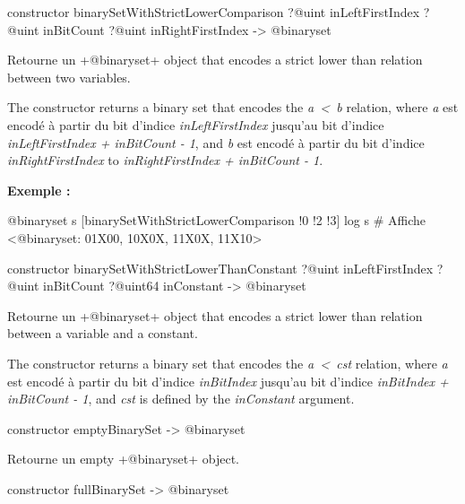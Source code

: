 \begin{galgas}
constructor binarySetWithStrictLowerComparison
  ?@uint inLeftFirstIndex
  ?@uint inBitCount
  ?@uint inRightFirstIndex
  -> @binaryset
\end{galgas}


Retourne un \ggs+@binaryset+ object that encodes a strict lower than relation between two variables.

The constructor returns a binary set that encodes the \emph{a~<~b} relation, where \emph{a} est encodé à partir du bit d'indice \emph{inLeftFirstIndex} jusqu'au bit d'indice \emph{inLeftFirstIndex  + inBitCount - 1}, and \emph{b} est encodé à partir du bit d'indice \emph{inRightFirstIndex} to \emph{inRightFirstIndex + inBitCount - 1}.

\textbf{Exemple :}
\begin{galgas}
@binaryset s [binarySetWithStrictLowerComparison !0 !2 !3]
log s # Affiche <@binaryset: 01X00, 10X0X, 11X0X, 11X10>
\end{galgas}





\begin{galgas}
constructor binarySetWithStrictLowerThanConstant
  ?@uint inLeftFirstIndex
  ?@uint inBitCount
  ?@uint64 inConstant
  -> @binaryset
\end{galgas}


Retourne un \ggs+@binaryset+ object that encodes a strict lower than relation between a variable and a constant.

The constructor returns a binary set that encodes the \emph{a~<~cst} relation, where \emph {a} est encodé à partir du bit d'indice \emph{inBitIndex} jusqu'au bit d'indice \emph{inBitIndex  + inBitCount - 1}, and \emph{cst} is defined by the \emph{inConstant} argument.





\begin{galgas}
constructor emptyBinarySet -> @binaryset
\end{galgas}


Retourne un empty \ggs+@binaryset+ object.






\begin{galgas}
constructor fullBinarySet -> @binaryset
\end{galgas}

